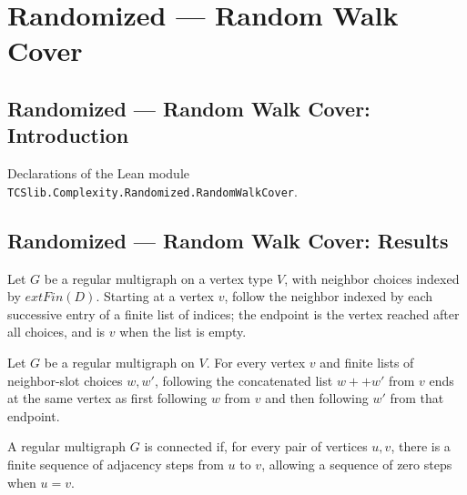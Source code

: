 \section{Randomized --- Random Walk Cover}
\subsection*{Randomized --- Random Walk Cover: Introduction}

Declarations of the Lean module \texttt{TCSlib.Complexity.Randomized.RandomWalkCover}.

\subsection*{Randomized --- Random Walk Cover: Results}

\begin{definition}
\label{Randomized.RegularMultigraph.endpoint}
\leanok
Let $G$ be a regular multigraph on a vertex type $V$, with neighbor choices indexed by
$	ext{Fin}(D)$. Starting at a vertex $v$, follow the neighbor indexed by each successive
entry of a finite list of indices; the endpoint is the vertex reached after all choices,
and is $v$ when the list is empty.
\end{definition}

\begin{theorem}
\label{Randomized.RegularMultigraph.endpoint_append}
\leanok
{}
Let $G$ be a regular multigraph on $V$. For every vertex $v$ and finite lists of
neighbor-slot choices $w,w'$, following the concatenated list $w++w'$ from $v$ ends at
the same vertex as first following $w$ from $v$ and then following $w'$ from that
endpoint.
\end{theorem}

\begin{definition}
\label{Randomized.RegularMultigraph.Connected}
\leanok
{}
A regular multigraph $G$ is connected if, for every pair of vertices $u,v$, there is a
finite sequence of adjacency steps from $u$ to $v$, allowing a sequence of zero steps
when $u=v$.
\end{definition}

